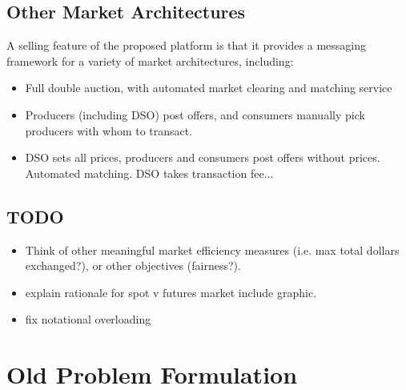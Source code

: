 \subsection{Other Market Architectures}
A selling feature of the proposed platform is that it provides a messaging framework for a variety of market architectures, including:
\begin{itemize}
\item Full double auction, with automated market clearing and matching service
\item Producers (including DSO) post offers, and consumers manually pick producers with whom to transact.
\item DSO sets all prices, producers and consumers post offers without prices. Automated matching. DSO takes transaction fee... 
\end{itemize}



\subsection{TODO}
\begin{itemize}
\item Think of other meaningful market efficiency measures (i.e. max total dollars exchanged?), or other objectives (fairness?). 
\item explain rationale for spot v futures market include graphic. 
\item fix notational overloading
\end{itemize}

\section{Old Problem Formulation}


\newcommand{\vx}[0]{\ensuremath{\boldsymbol{x}}}
\newcommand{\PUD}[0]{\ensuremath{\textit{PD}}}
\newcommand{\PUDD}[0]{\ensuremath{\textit{PDD}}}
\newcommand{\Real}[0]{\ensuremath{\mathbb{R}}}
\newcommand{\Natural}[0]{\ensuremath{\mathbb{N}}}

